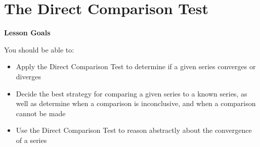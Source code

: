 \documentclass[main]{subfiles}
\begin{document}
\ifSubfilesClassLoaded{%
  \chaptermark{\chaptertwo}
}{}

\section{The Direct Comparison Test} \label{ws2-7}
\begin{framed}
\centerline{\textbf{Lesson Goals}}

You should be able to:
\begin{itemize}
\item Apply the Direct Comparison Test to determine if a given series converges or diverges
\item Decide the best strategy for comparing a given series to a known series, as well as determine when a comparison is inconclusive, and when a comparison cannot be made
\item Use the Direct Comparison Test to reason abstractly about the convergence of a series 
\end{itemize}
\end{framed}
\end{document}
